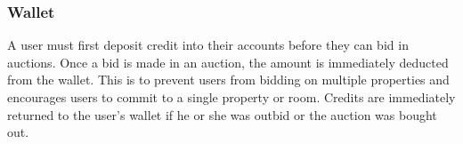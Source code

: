 \subsubsection{Wallet}
A user must first deposit credit into their accounts before they can bid in auctions.
Once a bid is made in
an auction, the amount is immediately deducted from the wallet. This is to prevent
users from bidding on multiple properties and encourages users to commit to a single
property or room. Credits are immediately returned to the user's wallet if
he or she was outbid or the auction was bought out.
